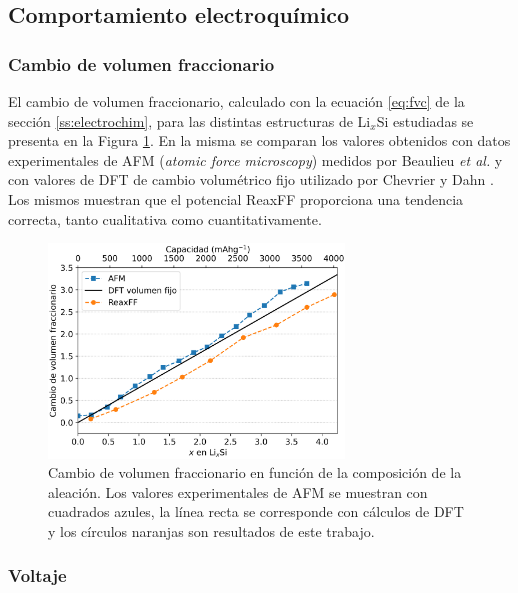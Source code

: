 \subsection{Comportamiento electroquímico}

\subsubsection{Cambio de volumen fraccionario}

El cambio de volumen fraccionario, calculado con la ecuación \ref{eq:fvc} de la 
sección \ref{ss:electrochim}, para las distintas estructuras de Li$_x$Si estudiadas 
se presenta en la Figura \ref{fig:fvc}. En la misma se comparan los valores 
obtenidos con datos experimentales de AFM (\textit{atomic force microscopy}) 
medidos por Beaulieu \textit{et al.} \cite{beaulieu2003} y con valores de DFT 
de cambio volumétrico fijo utilizado por Chevrier y Dahn \cite{chevrier2009}. 
Los mismos muestran que el potencial ReaxFF proporciona una tendencia correcta, 
tanto cualitativa como cuantitativamente.
\begin{figure}[h!]
    \centering
    \includegraphics[width=0.7\textwidth]{Silicio/caracterizacion/resultados/electroquimica/fvc.png}
    \caption{Cambio de volumen fraccionario en función de la composición de la 
    aleación. Los valores experimentales de AFM \cite{beaulieu2003} se muestran con cuadrados azules, 
    la línea recta se corresponde con cálculos de DFT \cite{chevrier2009} y los círculos naranjas son 
    resultados de este trabajo.}
    \label{fig:fvc}
\end{figure}

\subsubsection{Voltaje}

